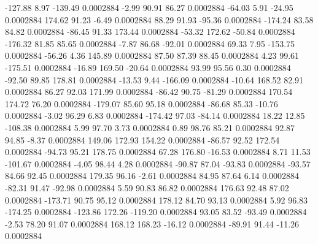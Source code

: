      -127.88        8.97     -139.49     0.0002884
       -2.99       90.91       86.27     0.0002884
      -64.03        5.91      -24.95     0.0002884
      174.62       91.23       -6.49     0.0002884
       88.29       91.93      -95.36     0.0002884
     -174.24       83.58       84.82     0.0002884
      -86.45       91.33      173.44     0.0002884
      -53.32      172.62      -50.84     0.0002884
     -176.32       81.85       85.65     0.0002884
       -7.87       86.68      -92.01     0.0002884
       69.33        7.95     -153.75     0.0002884
      -56.26        4.36      145.89     0.0002884
       87.50       87.39       88.45     0.0002884
        4.23       99.61     -175.51     0.0002884
      -16.89      169.50      -20.64     0.0002884
       93.99       95.56        0.30     0.0002884
      -92.50       89.85      178.81     0.0002884
      -13.53        9.44     -166.09     0.0002884
      -10.64      168.52       82.91     0.0002884
       86.27       92.03      171.99     0.0002884
      -86.42       90.75      -81.29     0.0002884
      170.54      174.72       76.20     0.0002884
     -179.07       85.60       95.18     0.0002884
      -86.68       85.33      -10.76     0.0002884
       -3.02       96.29        6.83     0.0002884
     -174.42       97.03      -84.14     0.0002884
       18.22       12.85     -108.38     0.0002884
        5.99       97.70        3.73     0.0002884
        0.89       98.76       85.21     0.0002884
       92.87       94.85       -8.37     0.0002884
      149.06      172.93      154.22     0.0002884
      -86.57       92.52      172.54     0.0002884
      -94.73       95.21      178.75     0.0002884
       67.28      176.80      -16.53     0.0002884
        8.71       11.53     -101.67     0.0002884
       -4.05       98.44        4.28     0.0002884
      -90.87       87.04      -93.83     0.0002884
      -93.57       84.66       92.45     0.0002884
      179.35       96.16       -2.61     0.0002884
       84.95       87.64        6.14     0.0002884
      -82.31       91.47      -92.98     0.0002884
        5.59       90.83       86.82     0.0002884
      176.63       92.48       87.02     0.0002884
     -173.71       90.75       95.12     0.0002884
      178.12       84.70       93.13     0.0002884
        5.92       96.83     -174.25     0.0002884
     -123.86      172.26     -119.20     0.0002884
       93.05       83.52      -93.49     0.0002884
       -2.53       78.20       91.07     0.0002884
      168.12      168.23      -16.12     0.0002884
      -89.91       91.44      -11.26     0.0002884
